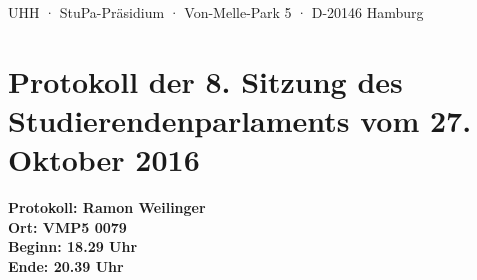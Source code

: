 \documentclass[ngerman,headheight=70pt]{scrartcl}
\begin{document}
    UHH · StuPa-Präsidium · Von-Melle-Park 5 · D-20146 Hamburg

    \section*{Protokoll der 8. Sitzung des Studierendenparlaments vom 27. Oktober 2016}

    \textbf{Protokoll: Ramon Weilinger}\\
    \textbf{Ort: VMP5 0079}\\
    \textbf{Beginn: 18.29 Uhr}\\
    \textbf{Ende: 20.39 Uhr}

    \vspace{0.5cm}
\end{document}

